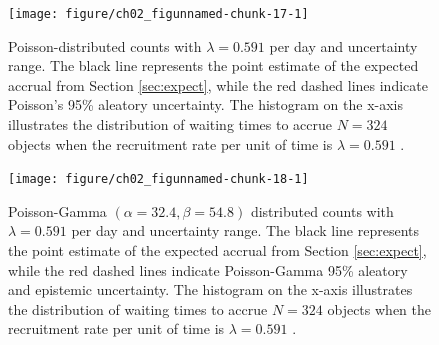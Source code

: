 \begin{figure}
\begin{knitrout}
\color{fgcolor}

{\centering \texttt{[image: figure/ch02\_figunnamed-chunk-17-1]} 

}


\end{knitrout}
  \caption{Poisson-distributed counts with $\lambda = 0.591$ per day and uncertainty range. The black line represents the point estimate of the expected accrual from Section \ref{sec:expect}, while the red dashed lines indicate Poisson's 95\% aleatory uncertainty. The histogram on the x-axis illustrates the distribution of waiting times to accrue $N=324$ objects when the recruitment rate per unit of time is $\lambda = 0.591$ \citep{spiegelhalter2011visualizing, pkgacc}.}
  \label{fig:2_13}
\end{figure}


\begin{figure}
\begin{knitrout}
\color{fgcolor}

{\centering \texttt{[image: figure/ch02\_figunnamed-chunk-18-1]} 

}


\end{knitrout}
  \caption{Poisson-Gamma $(\alpha = 32.4, \beta = 54.8)$ distributed counts with $\lambda = 0.591$ per day and uncertainty range. The black line represents the point estimate of the expected accrual from Section \ref{sec:expect}, while the red dashed lines indicate Poisson-Gamma 95\% aleatory and epistemic uncertainty. The histogram on the x-axis illustrates the distribution of waiting times to accrue $N=324$ objects when the recruitment rate per unit of time is $\lambda = 0.591$ \citep{spiegelhalter2011visualizing, pkgacc}.}
  \label{fig:2_14}
\end{figure}
